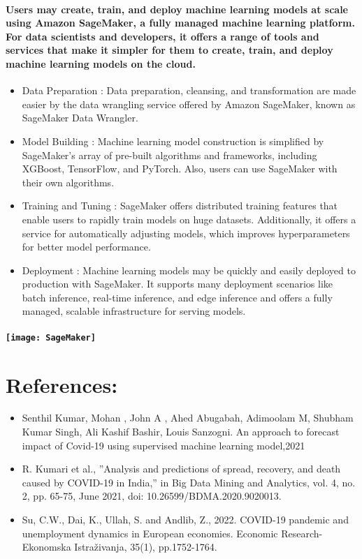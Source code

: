 \documentclass{article}
\begin{document}
\paragraph{
Users may create, train, and deploy machine learning models at scale using Amazon SageMaker, a fully managed machine learning platform. For data scientists and developers, it offers a range of tools and services that make it simpler for them to create, train, and deploy machine learning models on the cloud.
}
\begin{itemize}
    \item Data Preparation : Data preparation, cleansing, and transformation are made easier by the data wrangling service offered by Amazon SageMaker, known as SageMaker Data Wrangler.
    \item Model Building : Machine learning model construction is simplified by SageMaker's array of pre-built algorithms and frameworks, including XGBoost, TensorFlow, and PyTorch. Also, users can use SageMaker with their own algorithms.
    \item Training and Tuning : SageMaker offers distributed training features that enable users to rapidly train models on huge datasets. Additionally, it offers a service for automatically adjusting models, which improves hyperparameters for better model performance.
    \item Deployment : Machine learning models may be quickly and easily deployed to production with SageMaker. It supports many deployment scenarios like batch inference, real-time inference, and edge inference and offers a fully managed, scalable infrastructure for serving models.
\end{itemize}
\paragraph{
\texttt{[image: SageMaker]}
}

\section{References:}

\begin{itemize}
  \item Senthil Kumar, Mohan , John A , Ahed Abugabah, Adimoolam M,
Shubham Kumar Singh, Ali Kashif Bashir, Louis Sanzogni. An approach
to forecast impact of Covid-19 using supervised machine learning
model,2021
  \item R. Kumari et al., ”Analysis and predictions of spread, recovery, and
death caused by COVID-19 in India,” in Big Data Mining and Analytics,
vol. 4, no. 2, pp. 65-75, June 2021, doi: 10.26599/BDMA.2020.9020013.
  \item Su, C.W., Dai, K., Ullah, S. and Andlib, Z., 2022. COVID-19 pandemic and unemployment dynamics in European economies. Economic Research-Ekonomska Istraživanja, 35(1), pp.1752-1764.
\end{itemize}
\end{document}

